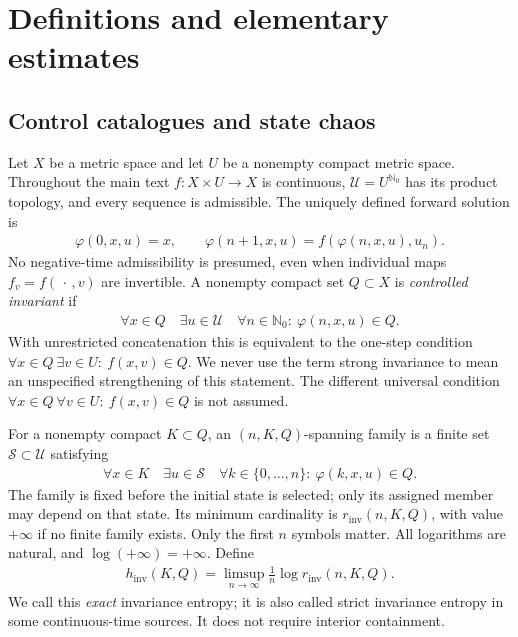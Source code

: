 \documentclass[11pt,a4paper]{article}
\theoremstyle{definition}
\theoremstyle{remark}
\begin{document}
\section{Definitions and elementary estimates}\label{sec:definitions}

\subsection{Control catalogues and state chaos}

Let \(X\) be a metric space and let \(U\) be a nonempty compact metric space. Throughout the main text \(f:X\times U\to X\) is continuous, \(\mathcal U=U^{\mathbb N_0}\) has its product topology, and every sequence is admissible. The uniquely defined forward solution is
\begin{align*}
 \varphi(0,x,u)=x,\qquad
 \varphi(n+1,x,u)=f(\varphi(n,x,u),u_n).
\end{align*}
No negative-time admissibility is presumed, even when individual maps \(f_v=f(\,\cdot\,,v)\) are invertible.
A nonempty compact set \(Q\subset X\) is \emph{controlled invariant} if
\begin{align*}
 \forall x\in Q\quad\exists u\in\mathcal U\quad
 \forall n\in\mathbb N_0:\ \varphi(n,x,u)\in Q.
\end{align*}
With unrestricted concatenation this is equivalent to the one-step condition
\(\forall x\in Q\ \exists v\in U:\ f(x,v)\in Q\).
We never use the term strong invariance to mean an unspecified strengthening of this statement. The different universal condition
\(\forall x\in Q\ \forall v\in U:\ f(x,v)\in Q\)
is not assumed.

For a nonempty compact \(K\subset Q\), an \((n,K,Q)\)-spanning family is a finite set \(\mathcal S\subset\mathcal U\) satisfying
\begin{align}\label{eq:quantifiers}
 \forall x\in K\quad\exists u\in\mathcal S\quad
 \forall k\in\{0,\ldots,n\}:\ \varphi(k,x,u)\in Q.
\end{align}
The family is fixed before the initial state is selected; only its assigned member may depend on that state. Its minimum cardinality is \(r_{\mathrm{inv}}(n,K,Q)\), with value \(+\infty\) if no finite family exists. Only the first \(n\) symbols matter. All logarithms are natural, and \(\log(+\infty)=+\infty\). Define
\begin{align}\label{eq:exact}
 h_{\mathrm{inv}}(K,Q)=\limsup_{n\to\infty}\frac1n\log r_{\mathrm{inv}}(n,K,Q).
\end{align}
We call this \emph{exact} invariance entropy; it is also called strict invariance entropy in some continuous-time sources. It does not require interior containment.
\end{document}
